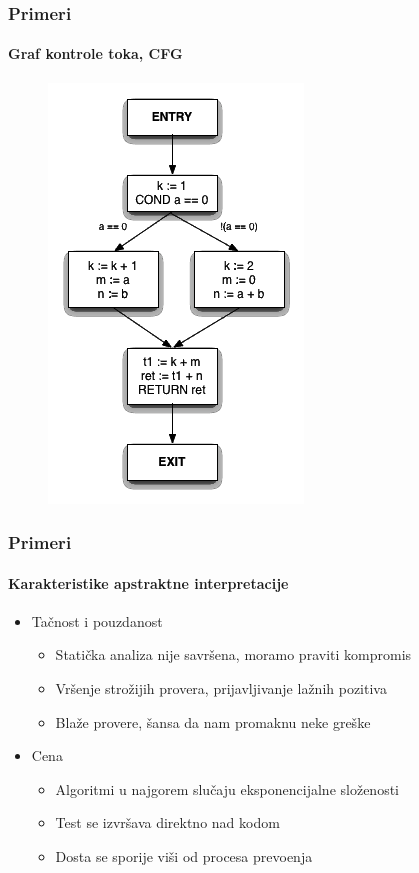 \documentclass[xetex,mathserif,serif]{beamer}
\begin{document}
  \begin{frame}
	\frametitle{Primeri}
    \framesubtitle{Graf kontrole toka, CFG}
	\begin{center}
   		\begin{multicols}{2}
			
    		\begin{figure}
				\includegraphics[scale=0.4,right]{Treehydra-cfg.png}
			\end{figure}
		\end{multicols}
	\end{center}
  \end{frame}
  \begin{frame}
    \frametitle{Primeri}
    \framesubtitle{Karakteristike apstraktne interpretacije}
	\begin{center}
		\begin{itemize}
			\item Ta\v cnost i pouzdanost
				\begin{itemize}
					\item Stati\v cka analiza nije savr\v sena, moramo praviti kompromis
					\item Vr\v senje stro\v zijih provera, prijavljivanje la\v znih pozitiva
					\item Bla\v ze provere, \v sansa da nam promaknu neke gre\v ske
				\end{itemize}
			\item Cena
				\begin{itemize}
					\item Algoritmi u najgorem slu\v caju eksponencijalne slo\v zenosti
					\item  {\color{green} Test se izvr\v sava direktno nad kodom}
					\item {\color{red} Dosta se sporije vi\v si od procesa prevo\dj{}enja}
				\end{itemize}
		\end{itemize}
	\end{center}
  \end{frame}
\end{document}
